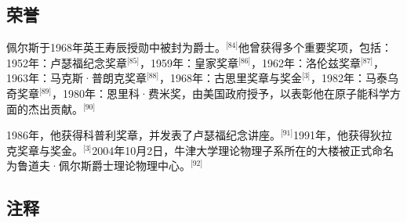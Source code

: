 \subsection{荣誉}
佩尔斯于1968年英王寿辰授勋中被封为爵士。\(^\text{[84]}\)他曾获得多个重要奖项，包括：1952年：卢瑟福纪念奖章\(^\text{[85]}\)，1959年：皇家奖章\(^\text{[86]}\)，1962年：洛伦兹奖章\(^\text{[87]}\)，1963年：马克斯·普朗克奖章\(^\text{[88]}\)，1968年：古思里奖章与奖金\(^\text{[3]}\)，1982年：马泰乌奇奖章\(^\text{[89]}\)，1980年：恩里科·费米奖，由美国政府授予，以表彰他在原子能科学方面的杰出贡献。\(^\text{[90]}\)

1986年，他获得科普利奖章，并发表了卢瑟福纪念讲座。\(^\text{[91]}\)1991年，他获得狄拉克奖章与奖金。\(^\text{[3]}\)2004年10月2日，牛津大学理论物理子系所在的大楼被正式命名为鲁道夫·佩尔斯爵士理论物理中心。\(^\text{[92]}\)
\subsection{注释}
